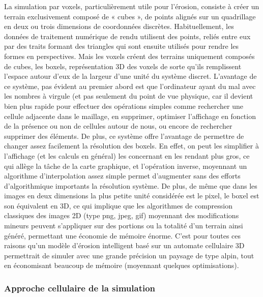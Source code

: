 \documentclass[a4paper,11pt]{article}
\begin{document}
La simulation par voxels, particulièrement utile pour l'érosion, consiste à créer un terrain exclusivement composé de « cubes », de points alignés sur un quadrillage en deux ou trois dimensions de coordonnées discrètes.
Habituellement, les données de traitement numérique de rendu utilisent des points, reliés entre eux par des traits formant des triangles qui sont ensuite utilisés pour rendre les formes en perspectives.
Mais les voxels créent des terrains uniquement composés de cubes, les boxels, représentation 3D des voxels de sorte qu'ils remplissent l'espace autour d'eux de la largeur d'une unité du système discret.
L'avantage de ce système, pas évident au premier abord est que l'ordinateur ayant du mal avec les nombres à virgule (et pas seulement du point de vue physique, car il devient bien plus rapide pour effectuer des opérations simples comme rechercher une cellule adjacente dans le maillage, en supprimer, optimiser l'affichage en fonction de la présence ou non de cellules autour de nous, ou encore de rechercher supprimer des éléments.
De plus, ce système offre l'avantage de permettre de changer assez facilement la résolution des boxels.
En effet, on peut les simplifier à l'affichage (et les calculs en général) les concernant en les rendant plus gros, ce qui allège la tâche de la carte graphique, et l'opération inverse, moyennant un algorithme d'interpolation assez simple permet d'augmenter sans des efforts d'algorithmique importants la résolution système.
De plus, de même que dans les images en deux dimensions la plus petite unité considérée est le pixel, le boxel est son équivalent en 3D, ce qui implique que les algorithmes de compression classiques des images 2D (type png, jpeg, gif) moyennant des modifications mineurs peuvent s'appliquer sur des portions ou la totalité d'un terrain ainsi généré, permettant une économie de mémoire énorme.
C'est pour toutes ces raisons qu'un modèle d'érosion intelligent basé sur un automate cellulaire 3D permettrait de simuler avec une grande précision un paysage de type alpin, tout en économisant beaucoup de mémoire (moyennant quelques optimisations).

\subsubsection{Approche cellulaire de la simulation}
\end{document}
